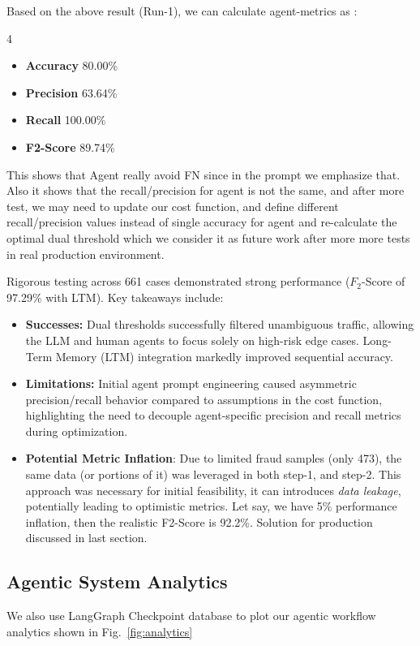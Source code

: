 \documentclass[stu, 12pt, floatsintext]{apa7}
\begin{document}
Based on the above result (Run-1), we can calculate agent-metrics as : 

\begin{multicols}{4}
\begin{itemize}
	\item \textbf{Accuracy} 80.00\%
	\item \textbf{Precision} 63.64\%
	\item \textbf{Recall}  100.00\%	
	\item \textbf{F2-Score} 89.74\%
\end{itemize}
\end{multicols}


This shows that Agent really avoid FN since in the prompt we emphasize that.  Also it shows that the recall/precision for agent is not the same, and after more test, we may need to update our cost function, and define different recall/precision values instead of single accuracy for agent and re-calculate the optimal dual threshold which we consider it as future work after more more tests in real production environment.

Rigorous testing across 661 cases demonstrated strong performance ($F_2$-Score of 97.29\% with LTM). Key takeaways include:
\begin{itemize}
	\item \textbf{Successes:} Dual thresholds successfully filtered unambiguous traffic, allowing the LLM and human agents to focus solely on high-risk edge cases. Long-Term Memory (LTM) integration markedly improved sequential accuracy.
	\item \textbf{Limitations:} Initial agent prompt engineering caused asymmetric precision/recall behavior compared to assumptions in the cost function, highlighting the need to decouple agent-specific precision and recall metrics during optimization.
	\item  \textbf{Potential Metric Inflation}: Due to limited fraud samples (only 473), the same data (or portions of it) was leveraged in both step-1, and step-2.  This approach was necessary for initial feasibility, it can introduces \textit{data leakage}, potentially leading to optimistic metrics.  Let say, we have 5\% performance inflation, then the realistic F2-Score is  92.2\%.  Solution for production discussed in last section.
\end{itemize}

\subsection{Agentic System Analytics}
We also use LangGraph Checkpoint database to  plot our agentic workflow analytics shown in Fig.~\ref{fig:analytics}
\end{document}
